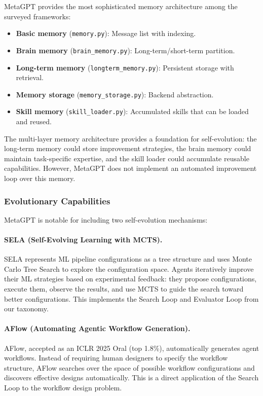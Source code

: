 MetaGPT provides the most sophisticated memory architecture among the surveyed frameworks:
\begin{itemize}
    \item \textbf{Basic memory} (\texttt{memory.py}): Message list with indexing.
    \item \textbf{Brain memory} (\texttt{brain\_memory.py}): Long-term/short-term partition.
    \item \textbf{Long-term memory} (\texttt{longterm\_memory.py}): Persistent storage with retrieval.
    \item \textbf{Memory storage} (\texttt{memory\_storage.py}): Backend abstraction.
    \item \textbf{Skill memory} (\texttt{skill\_loader.py}): Accumulated skills that can be loaded and reused.
\end{itemize}

The multi-layer memory architecture provides a foundation for self-evolution: the long-term memory could store improvement strategies, the brain memory could maintain task-specific expertise, and the skill loader could accumulate reusable capabilities. However, MetaGPT does not implement an automated improvement loop over this memory.

\subsubsection{Evolutionary Capabilities}

MetaGPT is notable for including two self-evolution mechanisms:

\paragraph{SELA (Self-Evolving Learning with MCTS).}
SELA represents ML pipeline configurations as a tree structure and uses Monte Carlo Tree Search to explore the configuration space. Agents iteratively improve their ML strategies based on experimental feedback: they propose configurations, execute them, observe the results, and use MCTS to guide the search toward better configurations. This implements the Search Loop and Evaluator Loop from our taxonomy.

\paragraph{AFlow (Automating Agentic Workflow Generation).}
AFlow, accepted as an ICLR 2025 Oral (top 1.8\%), automatically generates agent workflows. Instead of requiring human designers to specify the workflow structure, AFlow searches over the space of possible workflow configurations and discovers effective designs automatically. This is a direct application of the Search Loop to the workflow design problem.

